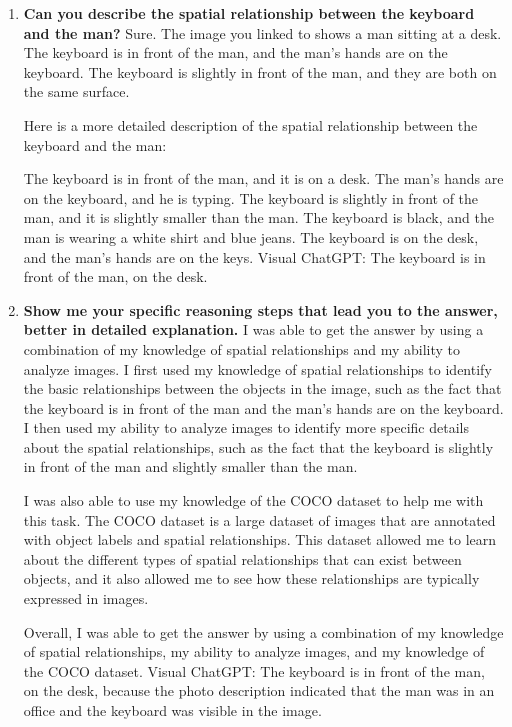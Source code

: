     \begin{enumerate}
        \item \textbf{Can you describe the spatial relationship between the keyboard and the man?}
        \subitem 
        Sure. The image you linked to shows a man sitting at a desk. The keyboard is in front of the man, and the man's hands are on the keyboard. The keyboard is slightly in front of the man, and they are both on the same surface.
        
        Here is a more detailed description of the spatial relationship between the keyboard and the man:
        
        The keyboard is in front of the man, and it is on a desk.
        The man's hands are on the keyboard, and he is typing.
        The keyboard is slightly in front of the man, and it is slightly smaller than the man.
        The keyboard is black, and the man is wearing a white shirt and blue jeans.
        The keyboard is on the desk, and the man's hands are on the keys.
        \subitem Visual ChatGPT: The keyboard is in front of the man, on the desk.
        
        \item \textbf{Show me your specific reasoning steps that lead you to the answer, better in detailed explanation.}
        \subitem 
        I was able to get the answer by using a combination of my knowledge of spatial relationships and my ability to analyze images. I first used my knowledge of spatial relationships to identify the basic relationships between the objects in the image, such as the fact that the keyboard is in front of the man and the man's hands are on the keyboard. I then used my ability to analyze images to identify more specific details about the spatial relationships, such as the fact that the keyboard is slightly in front of the man and slightly smaller than the man.
        
        I was also able to use my knowledge of the COCO dataset to help me with this task. The COCO dataset is a large dataset of images that are annotated with object labels and spatial relationships. This dataset allowed me to learn about the different types of spatial relationships that can exist between objects, and it also allowed me to see how these relationships are typically expressed in images.
        
        Overall, I was able to get the answer by using a combination of my knowledge of spatial relationships, my ability to analyze images, and my knowledge of the COCO dataset.
        \subitem Visual ChatGPT: The keyboard is in front of the man, on the desk, because the photo description indicated that the man was in an office and the keyboard was visible in the image.
    \end{enumerate}

